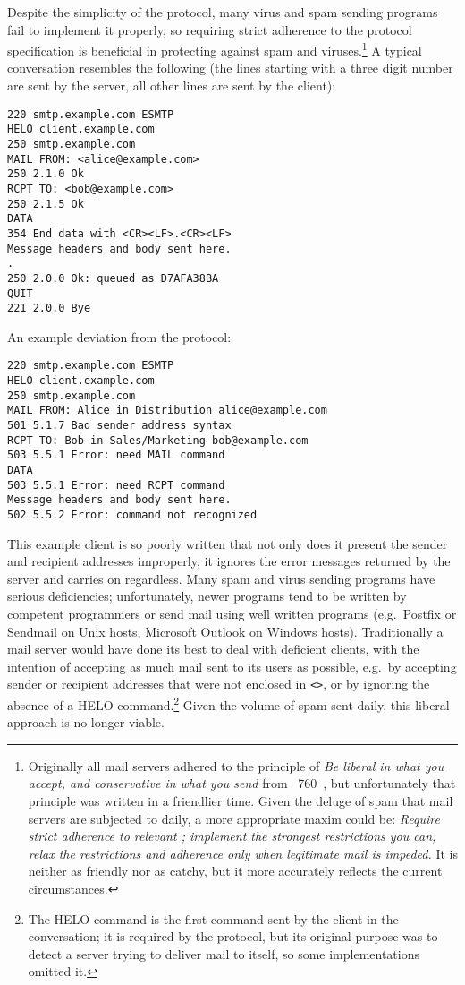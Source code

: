 \SMTPglossaryDescription{} Despite the simplicity of the protocol, many
virus and spam sending programs fail to implement it properly, so requiring
strict adherence to the protocol specification is beneficial in protecting
against spam and viruses.\footnote{Originally all mail servers adhered to
the principle of \textit{Be liberal in what you accept, and conservative in
what you send\/} from ~760~\cite{rfc760}, but unfortunately
that principle was written in a friendlier time.  Given the deluge of spam
that mail servers are subjected to daily, a more appropriate maxim could
be: \textit{Require strict adherence to relevant ; implement
the strongest restrictions you can; relax the restrictions and adherence
only when legitimate mail is impeded.\/}  It is neither as friendly nor as
catchy, but it more accurately reflects the current circumstances.} A
typical  conversation resembles the following (the lines
starting with a three digit number are sent by the server, all other lines
are sent by the client):

\begin{verbatim}
220 smtp.example.com ESMTP
HELO client.example.com
250 smtp.example.com
MAIL FROM: <alice@example.com>
250 2.1.0 Ok
RCPT TO: <bob@example.com>
250 2.1.5 Ok
DATA
354 End data with <CR><LF>.<CR><LF>
Message headers and body sent here.
.
250 2.0.0 Ok: queued as D7AFA38BA
QUIT
221 2.0.0 Bye
\end{verbatim}

An example deviation from the protocol:

\begin{verbatim}
220 smtp.example.com ESMTP
HELO client.example.com
250 smtp.example.com
MAIL FROM: Alice in Distribution alice@example.com
501 5.1.7 Bad sender address syntax
RCPT TO: Bob in Sales/Marketing bob@example.com
503 5.5.1 Error: need MAIL command
DATA
503 5.5.1 Error: need RCPT command
Message headers and body sent here.
502 5.5.2 Error: command not recognized
\end{verbatim}

This example client is so poorly written that not only does it present the
sender and recipient addresses improperly, it ignores the error messages
returned by the server and carries on regardless.  Many spam and virus
sending programs have serious deficiencies; unfortunately, newer programs
tend to be written by competent programmers or send mail using well written
programs (e.g.\ Postfix or Sendmail on Unix hosts, Microsoft Outlook on
Windows hosts).  Traditionally a mail server would have done its best to
deal with deficient clients, with the intention of accepting as much mail
sent to its users as possible, e.g.\ by accepting sender or recipient
addresses that were not enclosed in \texttt{<>}, or by ignoring the absence
of a HELO command.\footnote{The HELO command is the first command sent by
the client in the  conversation; it is required by the
protocol, but its original purpose was to detect a server trying to deliver
mail to itself, so some implementations omitted it.}  Given the volume of
spam sent daily, this liberal approach is no longer viable.

